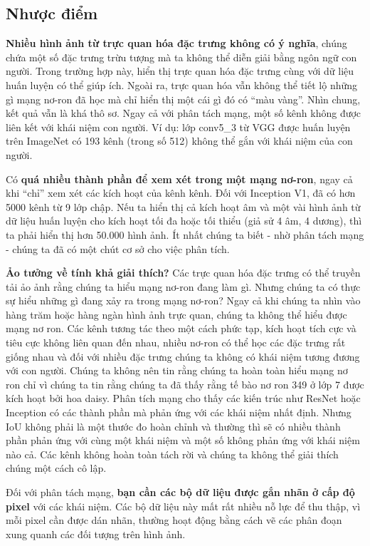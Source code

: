 \subsection{Nhược điểm}
\textbf{Nhiều hình ảnh từ trực quan hóa đặc trưng không có ý nghĩa}, chúng chứa một số đặc trưng trừu tượng mà ta không thể diễn giải bằng ngôn ngữ con người. Trong trường hợp này, hiển thị trực quan hóa đặc trưng cùng với dữ liệu huấn luyện có thể giúp ích. Ngoài ra, trực quan hóa vẫn không thể tiết lộ những gì mạng nơ-ron đã học mà chỉ hiển thị một cái gì đó có ``màu vàng''. Nhìn chung, kết quả vẫn là khá thô sơ. Ngay cả với phân tách mạng, một số kênh không được liên kết với khái niệm con người. Ví dụ: lớp conv5\_3 từ VGG được huấn luyện trên ImageNet có 193 kênh (trong số 512) không thể gắn với khái niệm của con người.

Có \textbf{quá nhiều thành phần để xem xét trong một mạng nơ-ron}, ngay cả khi ``chỉ'' xem xét các kích hoạt của kênh kênh. Đối với Inception V1, đã có hơn 5000 kênh từ 9 lớp chập. Nếu ta hiển thị cả kích hoạt âm và một vài hình ảnh từ dữ liệu huấn luyện cho kích hoạt tối đa hoặc tối thiểu (giả sử 4 âm, 4 dương), thì ta phải hiển thị hơn 50.000 hình ảnh. Ít nhất chúng ta biết - nhờ phân tách mạng - chúng ta đã có một chút cơ sở cho việc phân tích.

\textbf{Ảo tưởng về tính khả giải thích?} Các trực quan hóa đặc trưng có thể truyền tải ảo ảnh rằng chúng ta hiểu mạng nơ-ron đang làm gì. Nhưng chúng ta có thực sự hiểu những gì đang xảy ra trong mạng nơ-ron? Ngay cả khi chúng ta nhìn vào hàng trăm hoặc hàng ngàn hình ảnh trực quan, chúng ta không thể hiểu được mạng nơ ron. Các kênh tương tác theo một cách phức tạp, kích hoạt tích cực và tiêu cực không liên quan đến nhau, nhiều nơ-ron có thể học các đặc trưng rất giống nhau và đối với nhiều đặc trưng chúng ta không có khái niệm tương đương với con người. Chúng ta không nên tin rằng chúng ta hoàn toàn hiểu mạng nơ ron chỉ vì chúng ta tin rằng chúng ta đã thấy rằng tế bào nơ ron 349 ở lớp 7 được kích hoạt bởi hoa daisy. Phân tích mạng cho thấy các kiến trúc như ResNet hoặc Inception có các thành phần mà phản ứng với các khái niệm nhất định. Nhưng IoU không phải là một thước đo hoàn chỉnh và thường thì sẽ có nhiều thành phần phản ứng với cùng một khái niệm và một số không phản ứng với khái niệm nào cả. Các kênh không hoàn toàn tách rời và chúng ta không thể giải thích chúng một cách cô lập.

Đối với phân tách mạng, \textbf{bạn cần các bộ dữ liệu được gắn nhãn ở cấp độ pixel} với các khái niệm. Các bộ dữ liệu này mất rất nhiều nỗ lực để thu thập, vì mỗi pixel cần được dán nhãn, thường hoạt động bằng cách vẽ các phân đoạn xung quanh các đối tượng trên hình ảnh.

